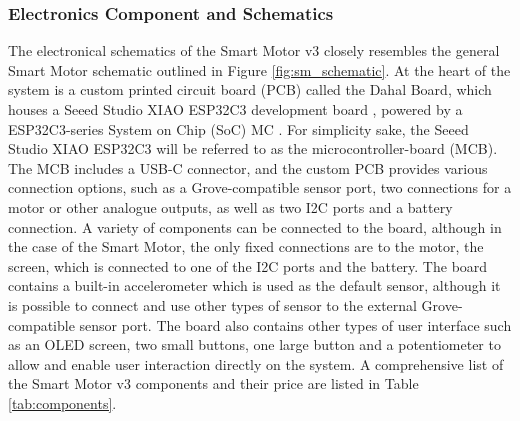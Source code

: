 \subsubsection{\label{sec:methods_sm_elec}Electronics Component and Schematics}
The electronical schematics of the Smart Motor v3 closely resembles the general Smart Motor schematic outlined in Figure \ref{fig:sm_schematic}. %
At the heart of the system is a custom printed circuit board (PCB) called the Dahal Board, which houses a Seeed Studio XIAO ESP32C3 development board \citep{seeed_studio_seeed_2024-2}, powered by a ESP32C3-series System on Chip (SoC) MC \citep{espressif_systems_esp32-c3_2024}. For simplicity sake, the Seeed Studio XIAO ESP32C3 will be referred to as the microcontroller-board (MCB). The MCB includes a USB-C connector, and the custom PCB provides various connection options, such as a Grove-compatible sensor port, two connections for a motor or other analogue outputs, as well as two I2C ports and a battery connection. A variety of components can be connected to the board, although in the case of the Smart Motor, the only fixed connections are to the motor, the screen, which is connected to one of the I2C ports and the battery. The board contains a built-in accelerometer which is used as the default sensor, although it is possible to connect and use other types of sensor to the external Grove-compatible sensor port. The board also contains other types of user interface such as an OLED screen, two small buttons, one large button and a potentiometer to allow and enable user interaction directly on the system. A comprehensive list of the Smart Motor v3 components and their price are listed in Table \ref{tab:components}.

